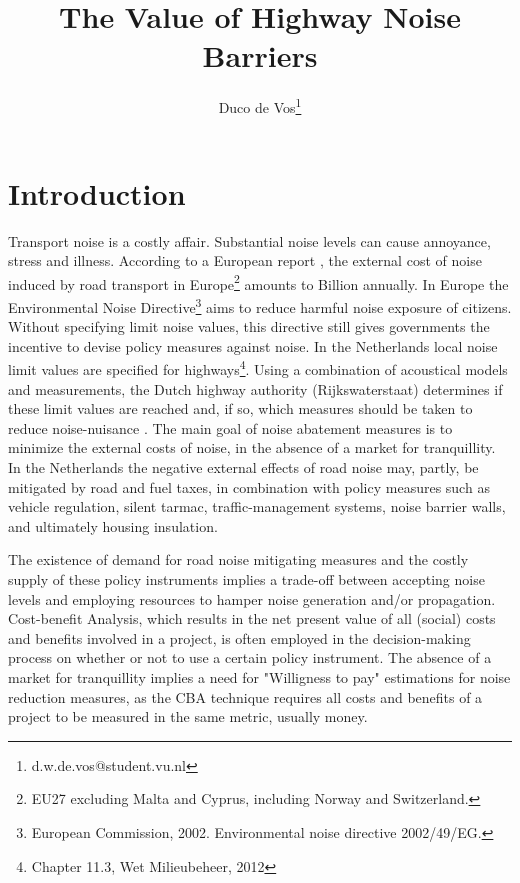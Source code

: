 \documentclass[]{scrartcl}
\title{The Value of Highway Noise Barriers}
\author{Duco de Vos\thanks{d.w.de.vos@student.vu.nl}}
\affil{Vrije Universiteit Amsterdam}
\begin{document}
\maketitle

\begin{abstract}

\end{abstract}

\section{Introduction}

Transport noise is a costly affair. Substantial noise levels can cause annoyance, stress and illness. According to a European report \citep{CEDelft2011}, the external cost of noise induced by road transport in Europe\footnote{EU27 excluding Malta and Cyprus, including Norway and Switzerland.} amounts to  Billion annually. In Europe the Environmental Noise Directive\footnote{European Commission, 2002. Environmental noise directive 2002/49/EG.} aims to reduce harmful noise exposure of citizens. Without specifying limit noise values, this directive still gives governments the incentive to devise policy measures against noise. In the Netherlands local noise limit values are specified for highways\footnote{Chapter 11.3, Wet Milieubeheer, 2012}. Using a combination of acoustical models and measurements, the Dutch highway authority (Rijkswaterstaat) determines if these limit values are reached and, if so, which measures should be taken to reduce noise-nuisance \citep{DeVos2015}. The main goal of noise abatement measures is to minimize the external costs of noise, in the absence of a market for tranquillity. In the Netherlands the negative external effects of road noise may, partly, be mitigated by road and fuel taxes, in combination with policy measures such as vehicle regulation, silent tarmac, traffic-management systems, noise barrier walls, and ultimately housing insulation\citep{RIVM2001}. 

The existence of demand for road noise mitigating measures and the costly supply of these policy instruments implies a trade-off between accepting noise levels and employing resources to hamper noise generation and/or propagation. Cost-benefit Analysis, which results in the net present value of all (social) costs and benefits involved in a project, is often employed in the decision-making process on whether or not to use a certain policy instrument. The absence of a market for tranquillity implies a need for "Willigness to pay" estimations for noise reduction measures, as the CBA technique requires all costs and benefits of a project to be measured in the same metric, usually money.
\end{document}
